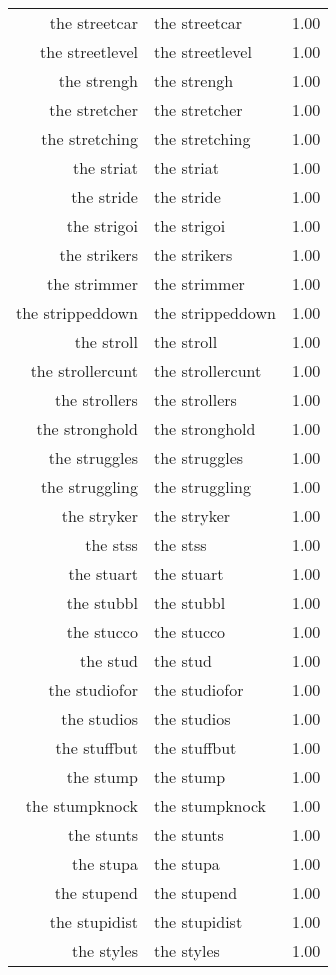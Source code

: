 \begin{table}[ht]
\begin{tabular}{rlr}
  the streetcar & the streetcar & 1.00 \\ 
  the streetlevel & the streetlevel & 1.00 \\ 
  the strengh & the strengh & 1.00 \\ 
  the stretcher & the stretcher & 1.00 \\ 
  the stretching & the stretching & 1.00 \\ 
  the striat & the striat & 1.00 \\ 
  the stride & the stride & 1.00 \\ 
  the strigoi & the strigoi & 1.00 \\ 
  the strikers & the strikers & 1.00 \\ 
  the strimmer & the strimmer & 1.00 \\ 
  the strippeddown & the strippeddown & 1.00 \\ 
  the stroll & the stroll & 1.00 \\ 
  the strollercunt & the strollercunt & 1.00 \\ 
  the strollers & the strollers & 1.00 \\ 
  the stronghold & the stronghold & 1.00 \\ 
  the struggles & the struggles & 1.00 \\ 
  the struggling & the struggling & 1.00 \\ 
  the stryker & the stryker & 1.00 \\ 
  the stss & the stss & 1.00 \\ 
  the stuart & the stuart & 1.00 \\ 
  the stubbl & the stubbl & 1.00 \\ 
  the stucco & the stucco & 1.00 \\ 
  the stud & the stud & 1.00 \\ 
  the studiofor & the studiofor & 1.00 \\ 
  the studios & the studios & 1.00 \\ 
  the stuffbut & the stuffbut & 1.00 \\ 
  the stump & the stump & 1.00 \\ 
  the stumpknock & the stumpknock & 1.00 \\ 
  the stunts & the stunts & 1.00 \\ 
  the stupa & the stupa & 1.00 \\ 
  the stupend & the stupend & 1.00 \\ 
  the stupidist & the stupidist & 1.00 \\ 
  the styles & the styles & 1.00 \\ 

\end{tabular}
\end{table}
